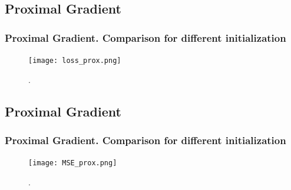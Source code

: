 \documentclass[hyperref={pdfpagelabels=false}]{beamer}
\begin{document}
\subsection{Proximal Gradient}
\begin{frame}
\frametitle{Proximal Gradient. Comparison for different initialization}
\begin{center}
\begin{figure}[h]
\begin{adjustwidth}{-0.2cm}{-0.5 cm}
\texttt{[image: loss\_prox.png]} \\
\end{adjustwidth}
\caption{.}
\end{figure}
\end{center}

\end{frame}
\subsection{Proximal Gradient}
\begin{frame}
\frametitle{Proximal Gradient. Comparison for different initialization}
\begin{center}
\begin{figure}[h]
\begin{adjustwidth}{-0.8cm}{-0.5 cm}
\texttt{[image: MSE\_prox.png]} \\
\end{adjustwidth}
\caption{.}
\end{figure}
\end{center}

\end{frame}
\end{document}
